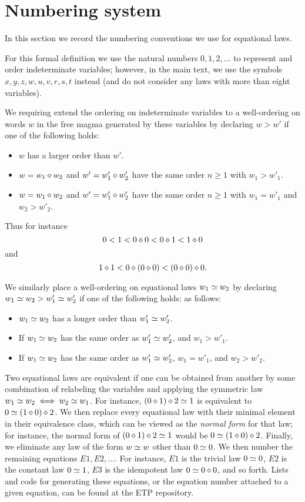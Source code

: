 \section{Numbering system}\label{numbering-app}

In this section we record the numbering conventions we use for equational laws.

For this formal definition we use the natural numbers $0,1,2,\dots$ to represent and order indeterminate variables; however, in the main text, we use the symbols $x,y,z,w,u,v,r,s,t$ instead (and do not consider any laws with more than eight variables).

We requiring extend the ordering on indeterminate variables to a well-ordering on words $w$ in the free magma generated by these variables by declaring $w > w'$ if one of the following holds:
\begin{itemize}
    \item $w$ has a larger order than $w'$.
    \item $w = w_1 \diamond w_2$ and $w' = w'_1 \diamond w'_2$ have the same order $n \geq 1$ with $w_1 > w'_1$.
    \item $w = w_1 \diamond w_2$ and $w' = w'_1 \diamond w'_2$ have the same order $n \geq 1$ with $w_1 = w'_1$ and $w_2 > w'_2$.
\end{itemize}
Thus for instance
$$ 0 < 1 < 0 \diamond 0 < 0 \diamond 1 < 1 \diamond 0 $$
and
$$ 1 \diamond 1 < 0 \diamond (0 \diamond 0) < (0 \diamond 0) \diamond 0.$$

We similarly place a well-ordering on equational laws $w_1 \simeq w_2$ by declaring $w_1 \simeq w_2 > w'_1 \simeq w'_2$ if one of the following holds:
as follows:
\begin{itemize}
\item  $w_1 \simeq w_2$ has a longer order than $w'_1 \simeq w'_2$.
\item If $w_1 \simeq w_2$ has the same order as $w'_1 \simeq w'_2$, and $w_1 > w'_1$.
\item If $w_1 \simeq w_2$ has the same order as $w'_1 \simeq w'_2$, $w_1 = w'_1$, and $w_2 > w'_2$.
\end{itemize}

Two equational laws are equivalent if one can be obtained from another by some combination of relabeling the variables and applying the symmetric law $w_1 \simeq w_2 \iff w_2 \simeq w_1$.  For instance, $(0 \diamond 1) \diamond 2 \simeq 1$ is equivalent to $0 \simeq (1 \diamond 0) \diamond 2$.  We then replace every equational law with their minimal element in their equivalence class, which can be viewed as the \emph{normal form} for that law; for instance, the normal form of $(0 \diamond 1) \diamond 2 \simeq 1$ would be $0 \simeq (1 \diamond 0) \diamond 2$.  Finally, we eliminate any law of the form $w \simeq w$ other than $0 \simeq 0$.  We then number the remaining equations $E1, E2, \dots$.  For instance, $E1$ is the trivial law $0 \simeq 0$, $E2$ is the constant law $0 \simeq 1$, $E3$ is the idempotent law $0 \simeq 0 \diamond 0$, and so forth.  Lists and code for generating these equations, or the equation number attached to a given equation, can be found at the ETP repository.

